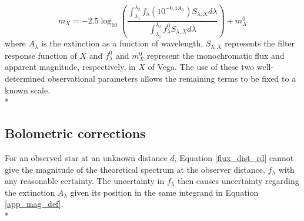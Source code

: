 \documentclass[12pt, a4paper]{report}
\begin{document}
\begin{equation}
m_{X} = -2.5 \log_{10} \left(\frac{ \int_{\lambda_{1}}^{\lambda_{2}} f_{\lambda} \left( 10^{-0.4 A_{\lambda}} \right) S_{\lambda,X} d\lambda }{ \int_{\lambda_{1}}^{\lambda_{2}} f_{\lambda}^{0} S_{\lambda,X} d\lambda }\right) + m_{X}^{0}
\label{app_mag_def}
\end{equation}
where $A_{\lambda}$ is the extinction as a function of wavelength, $S_{\lambda,X}$ represents the filter response function of $X$ and $f_{\lambda}^{0}$ and $m_{X}^{0}$ represent the monochromatic flux and apparent magnitude, respectively, in $X$ of Vega. The use of these two well-determined observational parameters allows the remaining terms to be fixed to a known scale.\\*

\subsection{Bolometric corrections} \label{bol_corr}

For an observed star at an unknown distance $d$, Equation \ref{flux_dist_rd} cannot give the magnitude of the theoretical spectrum at the observer distance, $f_{\lambda}$ with any reasonable certainty. The uncertainty in $f_{\lambda}$ then causes uncertainty regarding the extinction $A_{\lambda}$ given its position in the same integrand in Equation \ref{app_mag_def}.\\*
\end{document}
